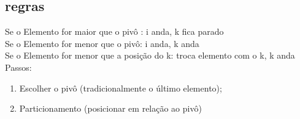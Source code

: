 \documentclass[•]{article}
\begin{document}
		\subsection{regras}
		Se o Elemento for maior que o pivô	: i anda, k fica parado\\
		Se o Elemento for menor que o pivô: i anda, k anda\\
		Se o Elemento for menor que a posição do k: troca elemento com o k, k anda
		Passos:
		\begin{enumerate}
			\item Escolher o pivô (tradicionalmente o último elemento);
			\item Particionamento (posicionar em relação ao pivô)
			
			
		\end{enumerate}
\end{document}
